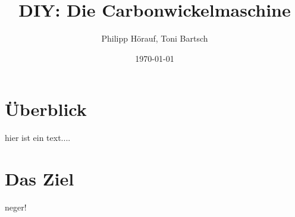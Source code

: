 \documentclass[12pt, a4paper, ngerman]{article}
\date{\today}
\author{Philipp Hörauf, Toni Bartsch}
\title{DIY: Die Carbonwickelmaschine}
\begin{document}
	\maketitle
	\tableofcontents
	\section{Überblick}
		hier ist ein text....
	
	\section{Das Ziel}
		neger!
\end{document}
